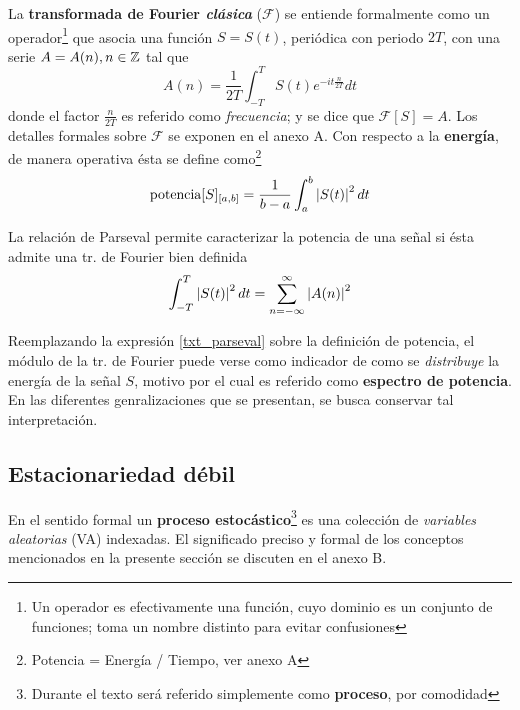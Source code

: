 La \textbf{transformada de Fourier \textit{clásica}} ($\mathscr{F} $) se entiende formalmente como 
un operador\footnote{Un operador es efectivamente una función, cuyo dominio es un conjunto de 
funciones; toma un nombre distinto para evitar confusiones} que asocia una función $S=S(t)$,
periódica con periodo $2T$, con una serie $A = A(n),  {n\in \mathbb{Z}}$ tal que
\begin{equation}
A(n) = \frac{1}{2T} \int_{-T}^{T} S(t) e^{ -i t \frac{n}{2T}} dt
\label{txt_s_fourier}
\end{equation}
%
donde el factor $\frac{n}{2T}$ es referido como \textit{frecuencia}; y se dice que 
$\mathscr{F}[S] = A$. Los detalles formales sobre $\mathscr{F}$ se exponen en el anexo A.
%
Con respecto a la \textbf{energía}, de manera operativa ésta se define 
como\footnote{Potencia = Energía / Tiempo, ver anexo A}
\begin{equation}
\text{potencia}[S]_{[a,b]} = \frac{1}{b-a} \int_a^{b} \left| S(t) \right|^{2} dt
\label{txt_potencia}
\end{equation}

La relación de Parseval permite caracterizar la potencia de una señal si ésta admite una tr. de
Fourier bien definida
%
\begin{equation}
\int_{-T}^{T} \left| S(t) \right|^{2} dt = \sum_{n=-\infty}^{\infty} \left| A(n) \right|^{2}
\label{txt_parseval}
\end{equation}

Reemplazando la expresión \ref{txt_parseval} sobre la definición de potencia, el módulo de la tr. 
de Fourier puede verse como indicador de como se \textit{distribuye} la energía de la señal $S$,
motivo por el cual es referido como \textbf{espectro de potencia}.
En las diferentes genralizaciones que se presentan, se busca conservar tal interpretación.
%
%



\subsection{Estacionariedad débil}

En el sentido formal un \textbf{proceso estocástico}\footnote{Durante el texto será referido 
simplemente como \textbf{proceso}, por comodidad} \xt es una colección de \textit{variables 
aleatorias} (VA) indexadas.
El significado preciso y formal de los conceptos mencionados en la presente sección se discuten en
el anexo B.

